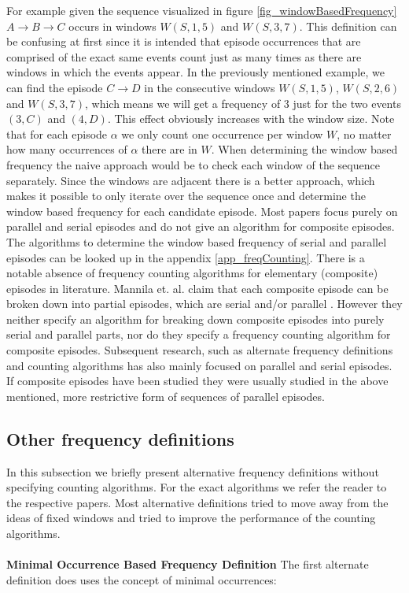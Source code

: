 For example given the sequence visualized in figure \ref{fig_windowBasedFrequency} $A \rightarrow B \rightarrow C$ occurs in windows $W(S,1,5)$ and $W(S,3,7)$. \newline 
This definition can be confusing at first since it is intended that episode occurrences that are comprised of the exact same events count just as many times as there are windows in which the events appear. In the previously mentioned example, we can find the episode $C \rightarrow D$ in the consecutive windows $W(S,1,5)$, $W(S,2,6)$ and $W(S,3,7)$, which means we will get a frequency of $3$ just for the two events $(3,C)$ and $(4,D)$. This effect obviously increases with the window size. Note that for each episode $\alpha$ we only count one occurrence per window $W$, no matter how many occurrences of $\alpha$ there are in $W$.\newline
When determining the window based frequency the naive approach would be to check each window of the sequence separately. Since the windows are adjacent there is a better approach, which makes it possible to only iterate over the sequence once and determine the window based frequency for each candidate episode. Most papers focus purely on parallel and serial episodes and do not give an algorithm for composite episodes. The algorithms to determine the window based frequency of serial and parallel episodes can be looked up in the appendix \ref{app_freqCounting}.
There is a notable absence of frequency counting algorithms for elementary (composite) episodes in literature. Mannila et. al. claim that each composite episode can be broken down into partial episodes, which are serial and/or parallel \cite{mannila1997discovery}. However they neither specify an algorithm for breaking down composite episodes into purely serial and parallel parts, nor do they specify a frequency counting algorithm for composite episodes. Subsequent research, such as alternate frequency definitions and counting algorithms has also mainly focused on parallel and serial episodes. If composite episodes have been studied they were usually studied in the above mentioned, more restrictive form of sequences of parallel episodes. \newline

\subsection{Other frequency definitions}
\label{subsec_otherFrequency}

In this subsection we briefly present alternative frequency definitions without specifying counting algorithms. For the exact algorithms we refer the reader to the respective papers. \newline
Most alternative definitions tried to move away from the ideas of fixed windows and tried to improve the performance of the counting algorithms. \\
\\
\textbf{Minimal Occurrence Based Frequency Definition} \newline
The first alternate definition does uses the concept of minimal occurrences:

